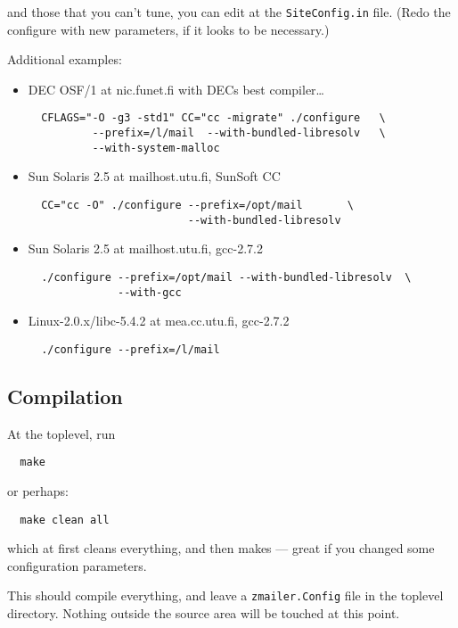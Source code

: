 and those that you can't tune, you can edit at the {\tt SiteConfig.in}
file.  (Redo the configure with new parameters, if it looks to be
necessary.)

Additional examples:
\begin{itemize}
\item DEC OSF/1 at nic.funet.fi with DECs best compiler\ldots

\begin{verbatim}
  CFLAGS="-O -g3 -std1" CC="cc -migrate" ./configure   \
          --prefix=/l/mail  --with-bundled-libresolv   \
          --with-system-malloc
\end{verbatim}

\item Sun Solaris 2.5  at mailhost.utu.fi, SunSoft CC

\begin{verbatim}
  CC="cc -O" ./configure --prefix=/opt/mail       \
                         --with-bundled-libresolv
\end{verbatim}

\item Sun Solaris 2.5  at mailhost.utu.fi, gcc-2.7.2

\begin{verbatim}
  ./configure --prefix=/opt/mail --with-bundled-libresolv  \ 
              --with-gcc
\end{verbatim}

\item Linux-2.0.x/libc-5.4.2 at mea.cc.utu.fi, gcc-2.7.2

\begin{verbatim}
  ./configure --prefix=/l/mail
\end{verbatim}
\end{itemize}


\subsection{Compilation}

At the toplevel, run
\begin{verbatim}
  make
\end{verbatim}

or perhaps:
\begin{verbatim}
  make clean all
\end{verbatim}

which at first cleans everything, and then makes --- great if you
changed some configuration parameters.

This should compile everything, and leave a {\tt zmailer.Config} file in
the toplevel directory.  Nothing outside the source area will be
touched at this point.

